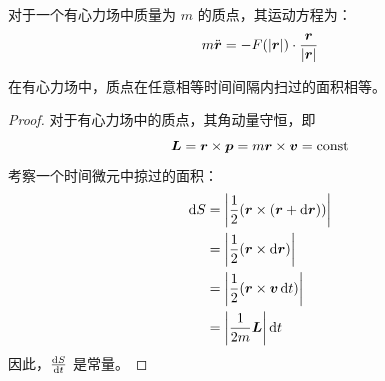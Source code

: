对于一个有心力场中质量为 $m$ 的质点，其运动方程为：
$$
m \ddot{\boldsymbol{r}} = -F(\abs{\boldsymbol{r}}) \cdot \frac{\boldsymbol{r}}{\abs{\boldsymbol{r}}}
$$

\begin{theorem}[开普勒第二定律]
    在有心力场中，质点在任意相等时间间隔内扫过的面积相等。

    \begin{proof}
        对于有心力场中的质点，其角动量守恒，即
        $$
        \boldsymbol{L} = \boldsymbol{r} \times \boldsymbol{p} = m \boldsymbol{r} \times \boldsymbol{v} = \text{const}
        $$
        考察一个时间微元中掠过的面积：
        $$
        \begin{aligned}
            \dd{S} & = \abs{\frac{1}{2} (\boldsymbol{r} \times (\boldsymbol{r} + \dd{\boldsymbol{r}}))} \\
            & = \abs{\frac{1}{2} (\boldsymbol{r} \times \dd{\boldsymbol{r}})} \\
            & = \abs{\frac{1}{2} (\boldsymbol{r} \times \boldsymbol{v} \dd{t})} \\
            & = \abs{\frac{1}{2m} \boldsymbol{L}} \dd{t}
        \end{aligned}
        $$
        因此，$\dv{S}{t}$ 是常量。
    \end{proof}
\end{theorem}

